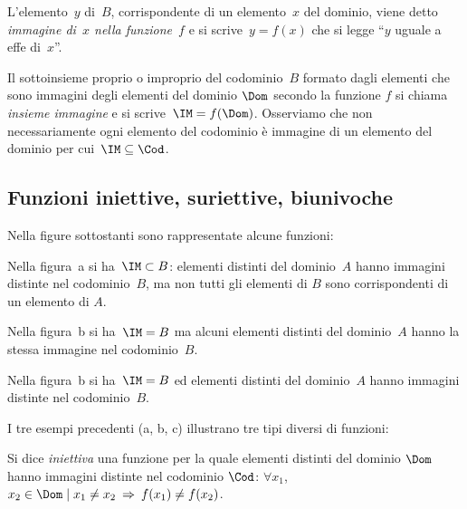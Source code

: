 \begin{definizione}\label{def:immagine_di_f}
 L'elemento~$y$ di~$B$, corrispondente di un elemento~$x$ del dominio, viene detto \emph{immagine di~$x$ nella funzione~$f$} e
si scrive~$y = f(x)$ che si legge ``$y$ uguale a effe di~$x$''.
\end{definizione}

Il sottoinsieme proprio o improprio del codominio~$B$ formato dagli elementi che sono
immagini degli elementi del dominio $\Dom$ secondo la funzione $f$ si chiama
\emph{insieme immagine} e si scrive~$\IM = f(\Dom)$. Osserviamo che non necessariamente
ogni elemento del codominio è immagine di un elemento del dominio per cui~$\IM\subseteq \Cod$.

 \vspazio\ovalbox{\risolvii \ref{ese:D.1}, \ref{ese:D.2}, \ref{ese:D.3}, \ref{ese:D.4}}

\subsection{Funzioni iniettive, suriettive, biunivoche}

\begin{exrig}
 \begin{esempio}
Nella figure sottostanti sono rappresentate alcune funzioni:
\begin{center}
 
\end{center}

Nella figura~a si ha~$\IM\subset B$: elementi distinti del dominio~$A$ hanno immagini distinte nel codominio~$B$, ma non tutti gli elementi di $B$ sono corrispondenti di un elemento di $A$.

Nella figura~b si ha~$\IM=B$ ma alcuni elementi distinti del dominio~$A$ hanno la stessa immagine nel codominio~$B$.

Nella figura~b si ha~$\IM=B$ ed elementi distinti del dominio~$A$ hanno immagini distinte nel codominio~$B$.
 \end{esempio}
\end{exrig}

I tre esempi precedenti (a, b, c) illustrano tre tipi diversi di funzioni:

\begin{definizione}
Si dice \emph{iniettiva} una funzione per la quale elementi distinti del
dominio $\Dom$ hanno immagini distinte nel codominio $\Cod$: $\forall x_1$, $x_2 \in \Dom \mid  x_1\neq x_2 \:\Rightarrow\: f(x_1)\neq f(x_2)$.
\end{definizione}


